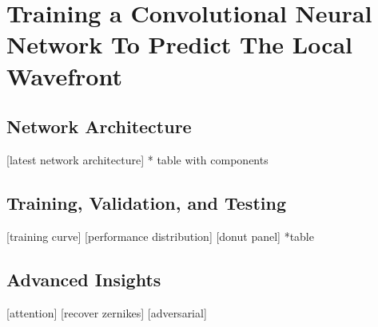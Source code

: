 \chapter{Training a Convolutional Neural Network To Predict The Local Wavefront}
\label{chap:cnn}

\section{Network Architecture}

[latest network architecture]
* table with components

\section{Training, Validation, and Testing}

[training curve]
[performance distribution]
[donut panel]
*table

\section{Advanced Insights}

[attention]
[recover zernikes]
[adversarial]
